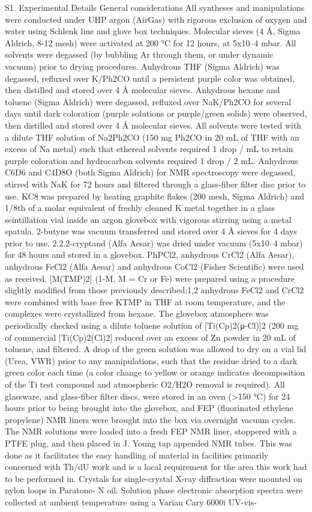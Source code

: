  
S1. Experimental Details 
General considerations 
All syntheses and manipulations were conducted under UHP argon (AirGas) with rigorous exclusion of oxygen and water 
using Schlenk line and glove box techniques. Molecular sieves (4 Å, Sigma Aldrich, 8-12 mesh) were activated at 200 °C for 
12 hours, at 5x10–4 mbar. All solvents were degassed (by bubbling Ar through them, or under dynamic vacuum) prior to drying 
procedures. Anhydrous THF (Sigma Aldrich) was degassed, refluxed over K/Ph2CO until a persistent purple color was 
obtained, then distilled and stored over 4 Å molecular sieves. Anhydrous hexane and toluene (Sigma Aldrich) were degassed, 
refluxed over NaK/Ph2CO for several days until dark coloration (purple solutions or purple/green solids) were observed, then 
distilled and stored over 4 Å molecular sieves. All solvents were tested with a dilute THF solution of Na2Ph2CO (150 mg 
Ph2CO in 20 mL of THF with an excess of Na metal) such that ethereal solvents required 1 drop / mL to retain purple coloration 
and hydrocarbon solvents required 1 drop / 2 mL. Anhydrous C6D6 and C4D8O (both Sigma Aldrich) for NMR spectroscopy 
were degassed, stirred with NaK for 72 hours and filtered through a glass-fiber filter disc prior to use. KC8 was prepared by 
heating graphite flakes (200 mesh, Sigma Aldrich) and 1/8th of a molar equivalent of freshly cleaned K metal together in a 
glass scintillation vial inside an argon glovebox with vigorous stirring using a metal spatula. 2-butyne was vacuum transferred 
and stored over 4 Å sieves for 4 days prior to use. 2.2.2-cryptand (Alfa Aesar) was dried under vacuum (5x10–4 mbar) for 48 
hours and stored in a glovebox. PhPCl2, anhydrous CrCl2 (Alfa Aesar), anhydrous FeCl2 (Alfa Aesar) and anhydrous CoCl2 
(Fisher Scientific) were used as received. [M(TMP)2] (1-M, M = Cr or Fe) were prepared using a procedure slightly modified 
from those previously described;1,2 anhydrous FeCl2 and CrCl2 were combined with base free KTMP in THF at room 
temperature, and the complexes were crystallized from hexane. The glovebox atmosphere was periodically checked using a 
dilute toluene solution of [Ti(Cp)2(μ-Cl)]2 (200 mg of commercial [Ti(Cp)2(Cl)2] reduced over an excess of Zn powder in 20 
mL of toluene, and filtered. A drop of the green solution was allowed to dry on a vial lid (Urea, VWR) prior to any 
manipulations, such that the residue dried to a dark green color each time (a color change to yellow or orange indicates 
decomposition of the Ti test compound and atmospheric O2/H2O removal is required). All glassware, and glass-fiber filter 
discs, were stored in an oven (>150 °C) for 24 hours prior to being brought into the glovebox, and FEP (fluorinated ethylene 
propylene) NMR liners were brought into the box via overnight vacuum cycles. The NMR solutions were loaded into a fresh 
FEP NMR liner, stoppered with a PTFE plug, and then placed in J. Young tap appended NMR tubes. This was done as it 
facilitates the easy handling of material in facilities primarily concerned with Th/dU work and is a local requirement for the 
area this work had to be performed in. Crystals for single-crystal X-ray diffraction were mounted on nylon loops in Paratone-
N oil. Solution phase electronic absorption spectra were collected at ambient temperature using a Varian Cary 6000i UV-vis-


